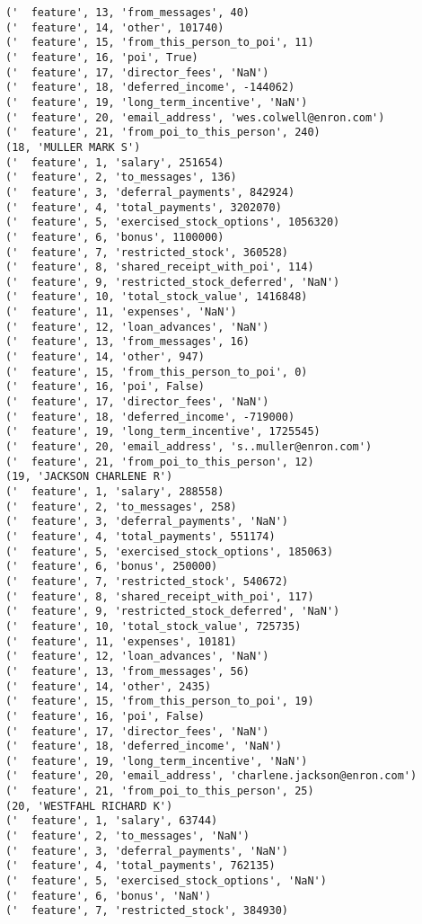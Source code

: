 \begin{verbatim}
('  feature', 13, 'from_messages', 40)
('  feature', 14, 'other', 101740)
('  feature', 15, 'from_this_person_to_poi', 11)
('  feature', 16, 'poi', True)
('  feature', 17, 'director_fees', 'NaN')
('  feature', 18, 'deferred_income', -144062)
('  feature', 19, 'long_term_incentive', 'NaN')
('  feature', 20, 'email_address', 'wes.colwell@enron.com')
('  feature', 21, 'from_poi_to_this_person', 240)
(18, 'MULLER MARK S')
('  feature', 1, 'salary', 251654)
('  feature', 2, 'to_messages', 136)
('  feature', 3, 'deferral_payments', 842924)
('  feature', 4, 'total_payments', 3202070)
('  feature', 5, 'exercised_stock_options', 1056320)
('  feature', 6, 'bonus', 1100000)
('  feature', 7, 'restricted_stock', 360528)
('  feature', 8, 'shared_receipt_with_poi', 114)
('  feature', 9, 'restricted_stock_deferred', 'NaN')
('  feature', 10, 'total_stock_value', 1416848)
('  feature', 11, 'expenses', 'NaN')
('  feature', 12, 'loan_advances', 'NaN')
('  feature', 13, 'from_messages', 16)
('  feature', 14, 'other', 947)
('  feature', 15, 'from_this_person_to_poi', 0)
('  feature', 16, 'poi', False)
('  feature', 17, 'director_fees', 'NaN')
('  feature', 18, 'deferred_income', -719000)
('  feature', 19, 'long_term_incentive', 1725545)
('  feature', 20, 'email_address', 's..muller@enron.com')
('  feature', 21, 'from_poi_to_this_person', 12)
(19, 'JACKSON CHARLENE R')
('  feature', 1, 'salary', 288558)
('  feature', 2, 'to_messages', 258)
('  feature', 3, 'deferral_payments', 'NaN')
('  feature', 4, 'total_payments', 551174)
('  feature', 5, 'exercised_stock_options', 185063)
('  feature', 6, 'bonus', 250000)
('  feature', 7, 'restricted_stock', 540672)
('  feature', 8, 'shared_receipt_with_poi', 117)
('  feature', 9, 'restricted_stock_deferred', 'NaN')
('  feature', 10, 'total_stock_value', 725735)
('  feature', 11, 'expenses', 10181)
('  feature', 12, 'loan_advances', 'NaN')
('  feature', 13, 'from_messages', 56)
('  feature', 14, 'other', 2435)
('  feature', 15, 'from_this_person_to_poi', 19)
('  feature', 16, 'poi', False)
('  feature', 17, 'director_fees', 'NaN')
('  feature', 18, 'deferred_income', 'NaN')
('  feature', 19, 'long_term_incentive', 'NaN')
('  feature', 20, 'email_address', 'charlene.jackson@enron.com')
('  feature', 21, 'from_poi_to_this_person', 25)
(20, 'WESTFAHL RICHARD K')
('  feature', 1, 'salary', 63744)
('  feature', 2, 'to_messages', 'NaN')
('  feature', 3, 'deferral_payments', 'NaN')
('  feature', 4, 'total_payments', 762135)
('  feature', 5, 'exercised_stock_options', 'NaN')
('  feature', 6, 'bonus', 'NaN')
('  feature', 7, 'restricted_stock', 384930)

\end{verbatim}
